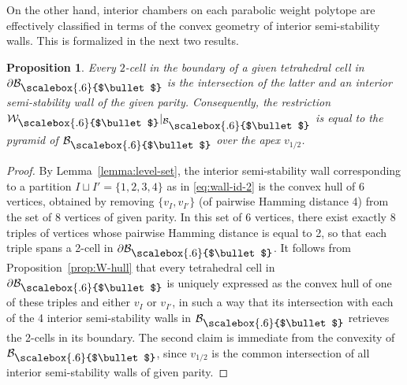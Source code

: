 \documentclass[10pt,a4paper]{amsart}
\newcommand\sbul[1][.6]{\mathbin{\vcenter{\hbox{\scalebox{#1}{$\bullet$}}}}}
\newcommand{\qB}{\mathcal{B}}
\newcommand{\qW}{\mathcal{W}}
\numberwithin{equation}{section}
\newtheorem{Proposition}[Theorem]{Proposition}
 { \theoremstyle{definition}
\newtheorem{Definition}[Theorem]{Definition}
\newtheorem{Note}[Theorem]{Note}
\newtheorem{Example}[Theorem]{Example}
\newtheorem{Remark}[Theorem]{Remark} }
\begin{document}
On the other hand, interior chambers on each parabolic weight polytope are effectively classified in terms of the convex geometry of interior semi-stability walls.
This is formalized in the next two results.

 \begin{Proposition}\label{prop:int-w}
Every $2$-cell in the boundary of a given tetrahedral cell in $\partial\qB_{\sbul}$ is the intersection of the latter and an interior semi-stability wall of the given parity. Consequently, the restriction $\qW_{\sbul}\vert_{\qB_{\sbul}}$ is equal to the pyramid of $\qB_{\sbul}$ over the apex $v_{1/2}$.
\end{Proposition}

\begin{proof}
By Lemma~\ref{lemma:level-set}, the interior semi-stability wall corresponding to a partition $I\sqcup I' = \{1,2,3,4\}$ as in \eqref{eq:wall-id-2} is the convex hull of 6 vertices, obtained by removing $\{v_{I}, v_{I'}\}$ (of pairwise Hamming distance 4) from the set of 8 vertices of given parity. In this set of 6 vertices, there exist exactly 8 triples of vertices whose pairwise Hamming distance is equal to 2, so that each triple spans a 2-cell in $\partial \qB_{\sbul}$. It follows from Proposition~\ref{prop:W-hull} that every tetrahedral cell in $\partial \qB_{\sbul}$ is uniquely expressed as the convex hull of one of these triples and either $v_{I}$ or $v_{I'}$, in such a way that its intersection with each of the 4 interior semi-stability walls in $\qB_{\sbul}$ retrieves the 2-cells in its boundary. The second claim is immediate from the convexity of $\qB_{\sbul}$, since $v_{1/2}$ is the common intersection of all interior semi-stability walls of given parity.
\end{proof}
\end{document}
